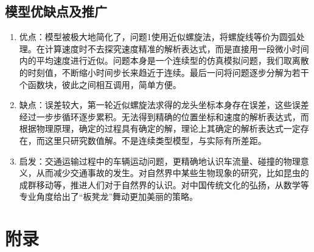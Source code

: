 \documentclass{cumcmthesis1}
\begin{document}
\subsection{模型优缺点及推广}
\begin{enumerate}
    \item 优点：模型被极大地简化了，问题1使用近似螺旋法，将螺旋线等价为圆弧处理。在计算速度时不去探究速度精准的解析表达式，而是直接用一段微小时间内的平均速度进行近似。问题本身是一个连续型的仿真模拟问题，我们取离散的时刻值，不断缩小时间步长来趋近于连续。最后一问将问题逐步分解为若干个函数块，彼此之间相互调用，简单方便。
    \item 缺点：误差较大，第一轮近似螺旋法求得的龙头坐标本身存在误差，这些误差经过一步步循环逐步累积。无法得到精确的位置坐标和速度的解析表达式，而根据物理原理，确定的过程具有确定的解，理论上其确定的解析表达式一定存在，而这里只研究数值解。不是连续类型模型，与实际有所差距。
    \item 启发：交通运输过程中的车辆运动问题，更精确地认识车流量、碰撞的物理意义，从而减少交通事故的发生。对自然界中某些生物现象的研究，比如昆虫的成群移动等，推进人们对于自然界的认识。对中国传统文化的弘扬，从数学等专业角度给出了“板凳龙”舞动更加美丽的策略。
\end{enumerate}



\newpage
\section{附录}
\end{document}
